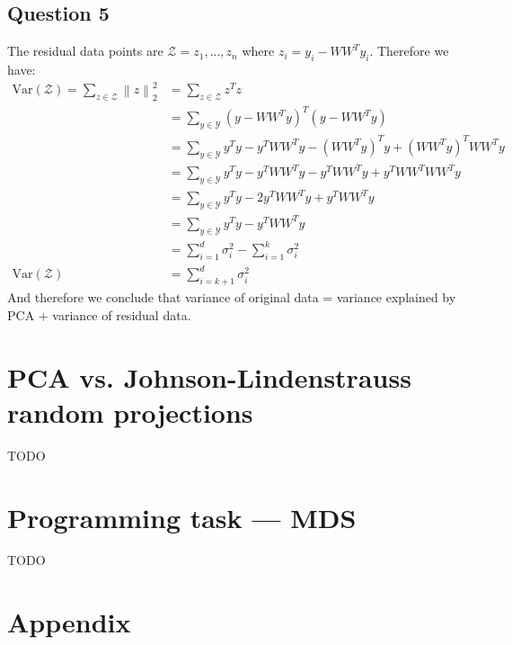 \documentclass{article}
\begin{document}
\subsection{Question 5}
The residual data points are $\mathcal{Z} = {z_1, ..., z_n}$ where $z_i = y_i - W W^T y_i$. Therefore we have:
\begin{equation}
    \begin{split}
        \text{Var}(\mathcal{Z}) = \sum_{z \in \mathcal{Z}} \left\lVert z \right\rVert^2_2 & = \sum_{z \in \mathcal{Z}} z^T z                                                     \\
                                                                                          & = \sum_{y \in \mathcal{Y}} (y - W W^T y)^T (y - W W^T y)                             \\
                                                                                          & = \sum_{y \in \mathcal{Y}} y^T y - y^T W W^T y - (W W^T y)^T y + (W W^T y)^T W W^T y \\
                                                                                          & = \sum_{y \in \mathcal{Y}} y^T y - y^T W W^T y - y^T W W^T y + y^T W W^T W W^T y     \\
                                                                                          & = \sum_{y \in \mathcal{Y}} y^T y - 2 y^T W W^T y + y^T W W^T y                       \\
                                                                                          & = \sum_{y \in \mathcal{Y}} y^T y - y^T W W^T y                                       \\
                                                                                          & = \sum_{i = 1}^d \sigma_i^2 - \sum_{i = 1}^k \sigma_i^2                              \\
        \text{Var}(\mathcal{Z})                                                           & = \sum_{i = k + 1}^d \sigma_i^2
    \end{split}
\end{equation}
And therefore we conclude that variance of original data = variance explained by PCA + variance of residual data.

\section{PCA vs. Johnson-Lindenstrauss random projections}

TODO

\section{Programming task — MDS}

TODO

\newpage
\appendix
\section{Appendix}
\end{document}

